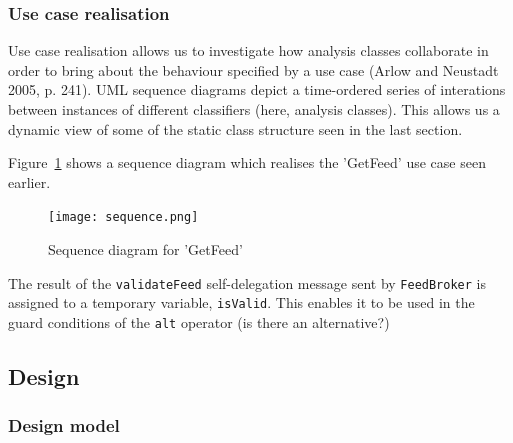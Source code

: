 \documentclass{article}
\begin{document}
\subsubsection{Use case realisation}



Use case realisation allows us to investigate how analysis classes collaborate in order to bring about the behaviour specified by a use case (Arlow and Neustadt 2005, p. 241). UML sequence diagrams depict a time-ordered series of interations between instances of different classifiers (here, analysis classes). This allows us a dynamic view of some of the static class structure seen in the last section.

Figure~\ref{sequence-diagram} shows a sequence diagram which realises the 'GetFeed' use case seen earlier.

\begin{figure}
  \begin{center}
    \texttt{[image: sequence.png]}
  \end{center}
  \label{sequence-diagram}
  \caption{Sequence diagram for 'GetFeed'}
\end{figure}

The result of the \texttt{validateFeed} self-delegation message sent by \texttt{FeedBroker} is assigned to a temporary variable, \texttt{isValid}. This enables it to be used in the guard conditions of the \texttt{alt} operator (is there an alternative?)


\subsection{Design}

\subsubsection{Design model}
\end{document}
